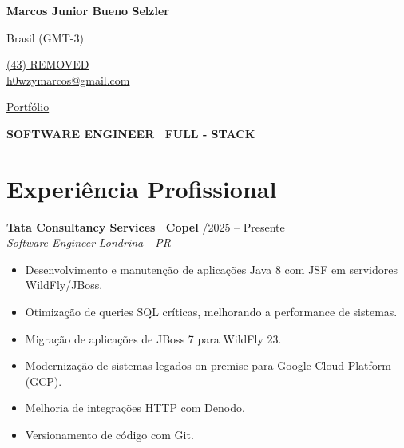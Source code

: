 \documentclass[a4paper,10pt]{article}
\newcommand{\entry}[4]{
  \noindent\textbf{#1} \hfill #2 \\
  \noindent\textit{#3} \hfill \textit{#4} \\
  \vspace{2pt}
}
\begin{document}
\small
\setlength{\parskip}{4pt}
\setlength{\parindent}{0pt}


\noindent
\begin{minipage}[t]{0.5\textwidth}
{\Large \textbf{Marcos Junior Bueno Selzler}}

\vspace{0.4em}

\end{minipage}%
\begin{minipage}[t]{0.5\textwidth}
\raggedleft

Brasil (GMT-3)

{\color{blue}} \href{tel:+5543REMOVED}{\faPhone \space (43) REMOVED} \\
{\color{blue}} \href{mailto:h0wzymarcos@gmail.com}{\faEnvelope \space h0wzymarcos@gmail.com} \\

\vspace{0.2em}

{\color{blue}} \href{https://linktr.ee/h0wzymarcos}{\faLink \space Portfólio}

\end{minipage}

\vspace{1em}

\begin{center}
    \textbf{SOFTWARE ENGINEER \textbar\ FULL - STACK}
\end{center}

\section*{Experiência Profissional}

\entry{Tata Consultancy Services \textbar\ Copel}{\faCalendar \space 05/2025 -- Presente}{Software Engineer}{Londrina - PR}
\vspace{-0.4em}
\begin{itemize}[leftmargin=*, itemsep=2pt]
\setlength\itemsep{0em}
\item Desenvolvimento e manutenção de aplicações Java 8 com JSF em servidores WildFly/JBoss.
\item Otimização de queries SQL críticas, melhorando a performance de sistemas.
\item Migração de aplicações de JBoss 7 para WildFly 23.
\item Modernização de sistemas legados on-premise para Google Cloud Platform (GCP).
\item Melhoria de integrações HTTP com Denodo.
\item Versionamento de código com Git.
\end{itemize}
\end{document}
